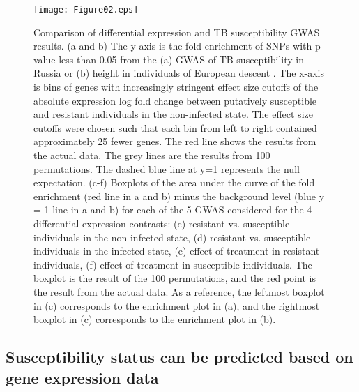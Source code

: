 \documentclass[fleqn,10pt]{wlscirep}
\begin{document}
\begin{figure}[p]
\centering
\texttt{[image: Figure02.eps]}
\caption{
Comparison of differential expression and TB susceptibility GWAS
results. (a and b) The y-axis is the fold enrichment of SNPs with
p-value less than 0.05 from the (a) GWAS of TB susceptibility in
Russia \cite{Curtis2015} or (b) height in individuals of European
descent \cite{LangoAllen2010}. The x-axis is bins of genes with
increasingly stringent effect size cutoffs of the absolute expression
log fold change between putatively susceptible and resistant
individuals in the non-infected state. The effect size cutoffs were
chosen such that each bin from left to right contained approximately
25 fewer genes. The red line shows the results from the actual data.
The grey lines are the results from 100 permutations. The dashed blue
line at y=1 represents the null expectation. (c-f) Boxplots of the
area under the curve of the fold enrichment (red line in a and b)
minus the background level (blue y = 1 line in a and b) for each of
the 5 GWAS \cite{Curtis2015, Thye2010, Sobota2016} considered for the
4 differential expression contrasts: (c) resistant vs. susceptible
individuals in the non-infected state, (d) resistant vs. susceptible
individuals in the infected state, (e) effect of treatment in
resistant individuals, (f) effect of treatment in susceptible
individuals. The boxplot is the result of the 100 permutations, and
the red point is the result from the actual data. As a reference, the
leftmost boxplot in (c) corresponds to the enrichment plot in (a), and
the rightmost boxplot in (c) corresponds to the enrichment plot in
(b).
}
\label{fig:gwas}
\end{figure}

\subsection*{Susceptibility status can be predicted based on gene expression data}
\end{document}
